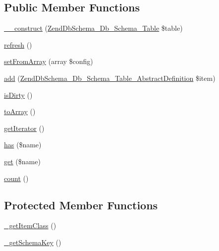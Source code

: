 \subsection*{Public Member Functions}
\begin{DoxyCompactItemize}
\item 
\hyperlink{classZendDbSchema__Db__Schema__Table__DefinitionManager__AbstractManager_a5cf66698784c55ebbd70292e268505af}{\-\_\-\-\_\-construct} (\hyperlink{classZendDbSchema__Db__Schema__Table}{Zend\-Db\-Schema\-\_\-\-Db\-\_\-\-Schema\-\_\-\-Table} \$table)
\item 
\hyperlink{classZendDbSchema__Db__Schema__Table__DefinitionManager__AbstractManager_a7503e344823c2a1e1e3beb80b8541116}{refresh} ()
\item 
\hyperlink{classZendDbSchema__Db__Schema__Table__DefinitionManager__AbstractManager_a40677ee7cb91e19c1587bdda9e73d3d5}{set\-From\-Array} (array \$config)
\item 
\hyperlink{classZendDbSchema__Db__Schema__Table__DefinitionManager__AbstractManager_a6d815884ca03c003ac7f8d633e97f7c6}{add} (\hyperlink{classZendDbSchema__Db__Schema__Table__AbstractDefinition}{Zend\-Db\-Schema\-\_\-\-Db\-\_\-\-Schema\-\_\-\-Table\-\_\-\-Abstract\-Definition} \$item)
\item 
\hyperlink{classZendDbSchema__Db__Schema__Table__DefinitionManager__AbstractManager_a6db6cee271f03bba6072d3a02a3df5d2}{is\-Dirty} ()
\item 
\hyperlink{classZendDbSchema__Db__Schema__Table__DefinitionManager__AbstractManager_ad4a6bb01a812258750793779a8bcae53}{to\-Array} ()
\item 
\hyperlink{classZendDbSchema__Db__Schema__Table__DefinitionManager__AbstractManager_a4e751d6138fb53e57d36c3394dbdc37f}{get\-Iterator} ()
\item 
\hyperlink{classZendDbSchema__Db__Schema__Table__DefinitionManager__AbstractManager_ad0261d0db60ff459f97adc23b2d16931}{has} (\$name)
\item 
\hyperlink{classZendDbSchema__Db__Schema__Table__DefinitionManager__AbstractManager_aad9bf04cf5d870b99595df9c2437821d}{get} (\$name)
\item 
\hyperlink{classZendDbSchema__Db__Schema__Table__DefinitionManager__AbstractManager_ab30d65c78b309ade24112b8eecadaf4e}{count} ()
\end{DoxyCompactItemize}
\subsection*{Protected Member Functions}
\begin{DoxyCompactItemize}
\item 
\hyperlink{classZendDbSchema__Db__Schema__Table__DefinitionManager__AbstractManager_ac62cf058c89132b0ff9223d9fcefdb8a}{\-\_\-get\-Item\-Class} ()
\item 
\hyperlink{classZendDbSchema__Db__Schema__Table__DefinitionManager__AbstractManager_ab930802b470913f09f29877ed094a760}{\-\_\-get\-Schema\-Key} ()
\end{DoxyCompactItemize}
